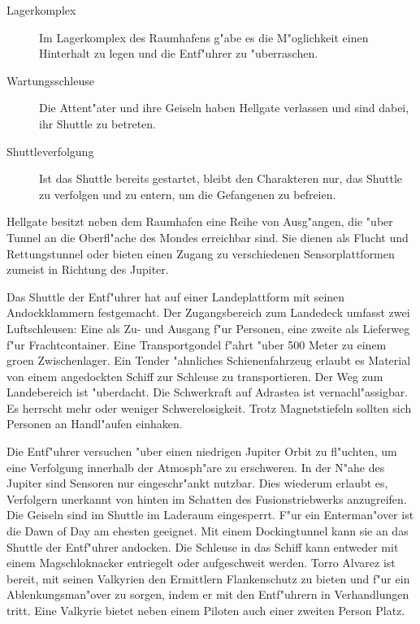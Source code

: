 \begin{description}
	\item [Lagerkomplex] Im Lagerkomplex des Raumhafens g"abe es die M"oglichkeit einen Hinterhalt zu legen und die Entf"uhrer zu 		
		"uberraschen.
	\item [Wartungsschleuse] Die Attent"ater und ihre Geiseln haben Hellgate verlassen und sind dabei, ihr Shuttle zu betreten.
	\item [Shuttleverfolgung] Ist das Shuttle bereits gestartet, bleibt den Charakteren nur, das Shuttle zu verfolgen und zu entern, um die 	
		Gefangenen zu befreien.
\end{description}



Hellgate besitzt neben dem Raumhafen eine Reihe von Ausg"angen, die "uber Tunnel an die Oberfl"ache des Mondes erreichbar sind. Sie dienen als Flucht und Rettungstunnel oder bieten einen Zugang zu verschiedenen Sensorplattformen zumeist in Richtung des Jupiter. 

Das Shuttle der Entf"uhrer hat auf einer Landeplattform mit seinen Andockklammern festgemacht. Der Zugangsbereich zum Landedeck umfasst zwei Luftschleusen: Eine als Zu- und Ausgang f"ur Personen, eine zweite als Lieferweg f"ur Frachtcontainer. Eine Transportgondel f"ahrt "uber 500 Meter zu einem gro\3en Zwischenlager. Ein Tender "ahnliches Schienenfahrzeug erlaubt es Material von einem angedockten Schiff zur Schleuse zu transportieren. Der Weg zum Landebereich ist "uberdacht.  Die Schwerkraft auf Adrastea ist vernachl"assigbar. Es herrscht mehr oder weniger Schwerelosigkeit. Trotz Magnetstiefeln sollten sich Personen an Handl"aufen einhaken.


Die Entf"uhrer versuchen "uber einen niedrigen Jupiter Orbit zu fl"uchten, um eine Verfolgung innerhalb der Atmosph"are zu erschweren. In der N"ahe des Jupiter sind Sensoren nur eingeschr"ankt nutzbar. Dies wiederum erlaubt es, Verfolgern unerkannt von hinten im Schatten des Fusionstriebwerks anzugreifen. Die Geiseln sind im Shuttle im Laderaum eingesperrt. F"ur ein Enterman"over ist die Dawn of Day am ehesten geeignet. Mit einem Dockingtunnel kann sie an das Shuttle der Entf"uhrer andocken. Die Schleuse in das Schiff kann entweder mit einem Magschlo\3knacker entriegelt oder aufgeschwei\3t werden. Torro Alvarez ist bereit, mit seinen Valkyrien den Ermittlern Flankenschutz zu bieten und f"ur ein Ablenkungsman"over zu sorgen, indem er mit den Entf"uhrern in Verhandlungen tritt. Eine Valkyrie bietet neben einem Piloten auch einer zweiten Person Platz.

